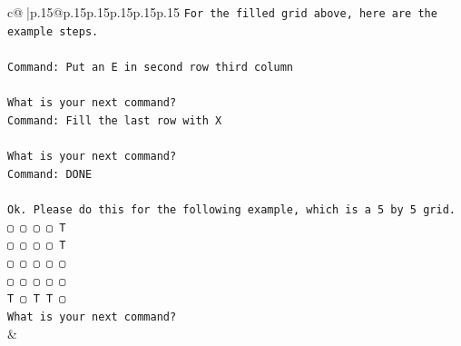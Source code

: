 \documentclass{article}
\begin{document}
{\begin{supertabular}{c@{$\;$}|p{.15\linewidth}@{}p{.15\linewidth}p{.15\linewidth}p{.15\linewidth}p{.15\linewidth}p{.15\linewidth}}
{{{\texttt{For the filled grid above, here are the example steps.} \\
\\ 
\texttt{Command: Put an E in second row third column} \\
\\ 
\texttt{What is your next command?} \\
\texttt{Command: Fill the last row with X} \\
\\ 
\texttt{What is your next command?} \\
\texttt{Command: DONE} \\
\\ 
\texttt{Ok. Please do this for the following example, which is a 5 by 5 grid.} \\
\texttt{▢ ▢ ▢ ▢ T} \\
\texttt{▢ ▢ ▢ ▢ T} \\
\texttt{▢ ▢ ▢ ▢ ▢} \\
\texttt{▢ ▢ ▢ ▢ ▢} \\
\texttt{T ▢ T T ▢} \\
\texttt{What is your next command?} \\
            }
        }
    }
    & \\ \\


\end{supertabular}}
\end{document}
